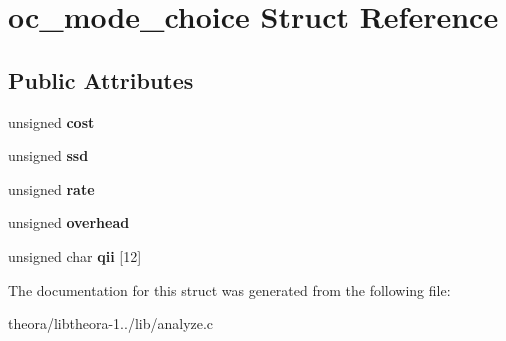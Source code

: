 \hypertarget{structoc__mode__choice}{\section{oc\+\_\+mode\+\_\+choice Struct Reference}
\label{structoc__mode__choice}
}
\subsection*{Public Attributes}
\begin{DoxyCompactItemize}
\item 
\hypertarget{structoc__mode__choice_ac7a93f56e7e753308cef5828965fedc4}{unsigned {\bfseries cost}}\label{structoc__mode__choice_ac7a93f56e7e753308cef5828965fedc4}

\item 
\hypertarget{structoc__mode__choice_a9204022821308cd1107a598dd133a503}{unsigned {\bfseries ssd}}\label{structoc__mode__choice_a9204022821308cd1107a598dd133a503}

\item 
\hypertarget{structoc__mode__choice_ab711f91acc78dc0f5f7249ca112e919f}{unsigned {\bfseries rate}}\label{structoc__mode__choice_ab711f91acc78dc0f5f7249ca112e919f}

\item 
\hypertarget{structoc__mode__choice_afb0014d0574cfed427448d1d68fc8ccd}{unsigned {\bfseries overhead}}\label{structoc__mode__choice_afb0014d0574cfed427448d1d68fc8ccd}

\item 
\hypertarget{structoc__mode__choice_a3f0d969c15f25105faae56f03577a06c}{unsigned char {\bfseries qii} \mbox{[}12\mbox{]}}\label{structoc__mode__choice_a3f0d969c15f25105faae56f03577a06c}

\end{DoxyCompactItemize}


The documentation for this struct was generated from the following file\+:\begin{DoxyCompactItemize}
\item 
theora/libtheora-\/1../lib/analyze.\+c\end{DoxyCompactItemize}
